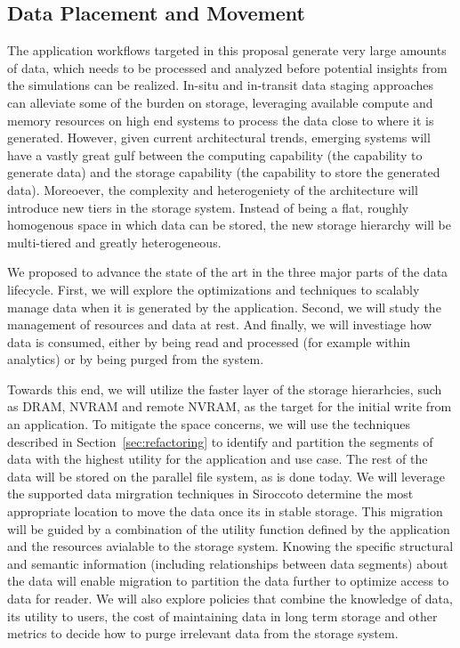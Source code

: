 \subsection{Data Placement and Movement}
\newcommand{\Sir}{Sirocco}

The application workflows targeted in this proposal generate very large
amounts of data, which needs to be processed and analyzed before
potential insights from the simulations can be realized. 
In-situ and in-transit data staging approaches can alleviate some of the
burden on storage, leveraging available compute and memory resources on high
end systems to process the data close to where it is generated. 
However, given current architectural trends, emerging systems will have a
vastly great gulf between the computing capability (the capability to
generate data) and the storage capability (the capability to store the
generated data). Moreoever, the complexity and heterogeniety of the
architecture will introduce new tiers in the storage system. Instead of
being a flat, roughly homogenous space in which data can be stored, the new
storage hierarchy will be multi-tiered and greatly heterogeneous. 

We proposed to advance the state of the art in the three major parts of the
data lifecycle. First, we will explore the optimizations and techniques to
scalably manage data when it is generated by the application. Second, we
will study the management of resources and data at rest. And finally, we will
investiage how data is consumed, either by being read and processed (for
example within analytics) or by being purged from the system. 

Towards this end, we will utilize the faster layer of the
storage hierarhcies, such as DRAM, NVRAM and remote NVRAM, as the target for
the initial write from an application. To mitigate the space concerns, we
will use the techniques described in Section~\ref{sec:refactoring} to
identify and partition the segments of data with the highest utility for the
application and use case. The rest of the data will be stored on the
parallel file system, as is done today. We will leverage the supported data
mirgration techniques in \Sir to determine the most appropriate location to
move the data once its in stable storage. This migration will be guided by a
combination of the utility function defined by the application and the
resources avialable to the storage system. Knowing the specific structural
and semantic information (including relationships between data segments)
about the data will enable migration to partition the data further to
optimize access to data for reader. 
We will also explore policies that combine the knowledge of data, its
utility to users, the cost of maintaining data in long term storage and
other metrics to decide how to purge irrelevant data from the storage
system. 

